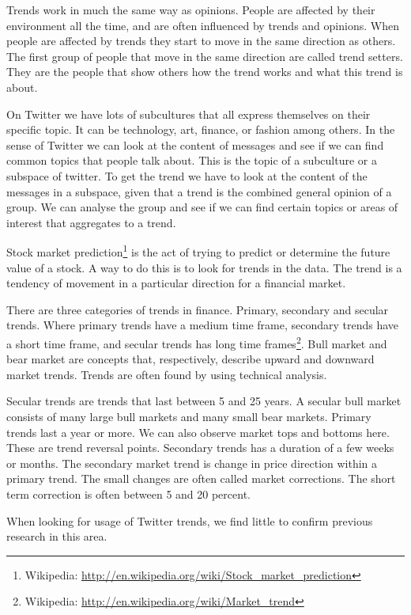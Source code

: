 Trends work in much the same way as opinions. People are affected by their
environment all the time, and are often influenced by trends and opinions. When
people are affected by trends they start to move in the same direction as
others. The first group of people that move in the same
direction are called trend setters. They are the people that show others how
the trend works and what this trend is about. 

On Twitter we have lots of subcultures that all express themselves on their
specific topic. It can be technology, art, finance, or fashion among others.  
In the sense of Twitter we can look at the content of
messages and see if we can find common topics that people talk
about. This is the topic of a subculture or a subspace of twitter. To get
the trend we have to look at the content of the messages in a subspace, given
that a trend is the combined general opinion of a group. We can analyse the
group and see if we can find certain topics or areas of interest that aggregates
to a trend.  

Stock market prediction\footnote{Wikipedia: \url{http://en.wikipedia.org/wiki/Stock_market_prediction}}
is the act of trying to predict or determine the future
value of a stock. A way to do this is to look for trends in the data. The trend
is a tendency of movement in a particular direction for a financial market.

There are three categories of trends in finance. Primary, secondary and secular
trends. Where primary trends have a medium time frame, secondary trends have a short
time frame, and secular trends has long time frames\footnote{Wikipedia:
\url{http://en.wikipedia.org/wiki/Market_trend}}. Bull market and bear market
are concepts that, respectively, describe upward and downward market trends. 
Trends are often found by using technical analysis.  

Secular trends are trends that last between 5 and 25 years. A secular bull
market consists of many large bull markets and many small bear markets.
Primary trends last a year or more. We can also observe market tops and
bottoms here. These are trend reversal points. Secondary trends has a
duration of a few weeks or months. The secondary market trend is change in
price direction within a primary trend. The small changes are often called
market corrections. The short term correction is often between 5 and 20 percent.

When looking for usage of Twitter trends, we find little to confirm previous
research in this area. 
%
